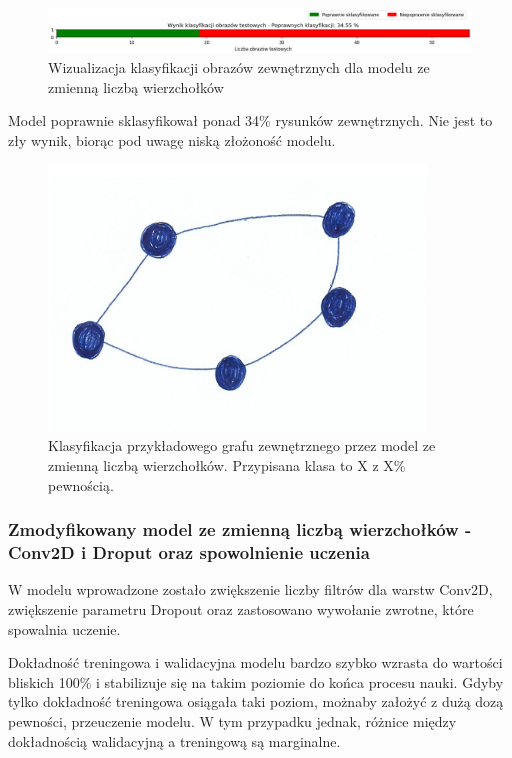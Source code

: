 \begin{figure}[ht]
	\centering
	\includegraphics[width=14cm]{resources/tests/images/v3/multiple_edges_bar.png}
	\caption{Wizualizacja klasyfikacji obrazów zewnętrznych dla modelu ze zmienną liczbą wierzchołków}
	\label{Fig:tests-var-0c}
\end{figure}
\FloatBarrier

Model poprawnie sklasyfikował ponad 34\% rysunków zewnętrznych.
Nie jest to zły wynik, biorąc pod uwagę niską złożoność modelu.

\begin{figure}[ht]
	\centering
	\includegraphics[width=10cm]{../graph_classification/test_graphs/drawn/cycle-7.png}
	\caption{Klasyfikacja przykładowego grafu zewnętrznego przez model ze zmienną liczbą wierzchołków.
		Przypisana klasa to X z X\% pewnością.}
	\label{Fig:tests-var-0d}
\end{figure}
\FloatBarrier

\subsubsection{Zmodyfikowany model ze zmienną liczbą wierzchołków - Conv2D i Droput oraz spowolnienie uczenia}

W modelu wprowadzone zostało zwiększenie liczby filtrów dla warstw Conv2D, zwiększenie parametru Dropout
oraz zastosowano wywołanie zwrotne, które spowalnia uczenie.

Dokładność treningowa i walidacyjna modelu bardzo szybko wzrasta do wartości bliskich 100\%
i stabilizuje się na takim poziomie do końca procesu nauki.
Gdyby tylko dokładność treningowa osiągała taki poziom, możnaby założyć z dużą dozą pewności, przeuczenie modelu.
W tym przypadku jednak, różnice między dokładnością walidacyjną a treningową są marginalne.

